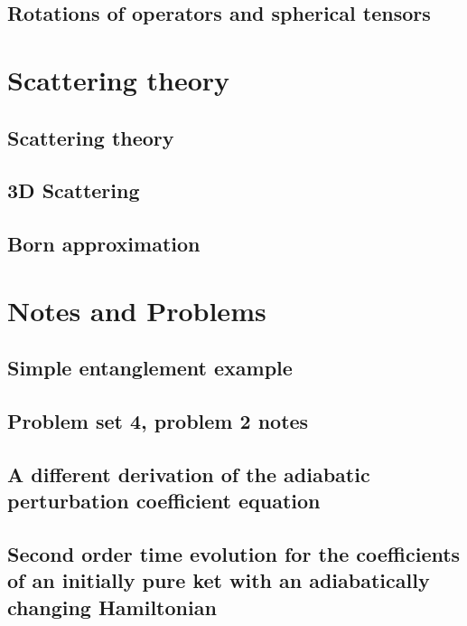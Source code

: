    \chapter{Rotations of operators and spherical tensors}
      
      

\part{Scattering theory}
   \chapter{Scattering theory}
      
      
   \chapter{3D Scattering}
      
      
   \chapter{Born approximation}
      

\part{Notes and Problems}
   \chapter{Simple entanglement example}
      
   \chapter{Problem set 4, problem 2 notes}
      
   \chapter{A different derivation of the adiabatic perturbation coefficient equation}
      
   \chapter{Second order time evolution for the coefficients of an initially pure ket with an adiabatically changing Hamiltonian}
      

